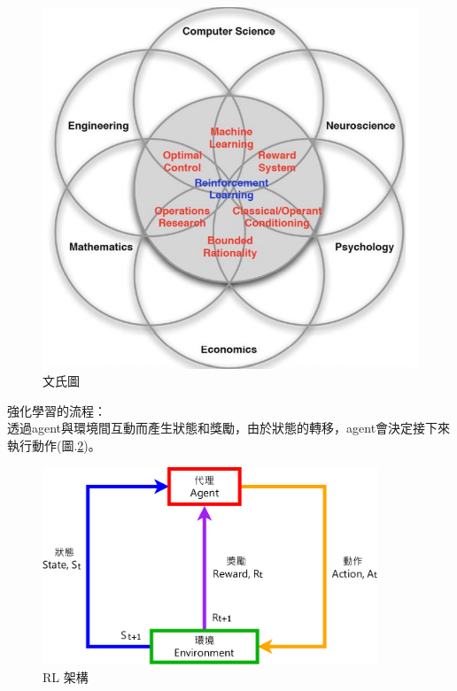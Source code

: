 \documentclass[14pt,a4paper]{report}  %
\begin{document}
\begin{figure}[hbt!]
\begin{center}
\includegraphics[scale=0.6]{Faces_of_Reinforcement_Learning}
\caption{\Large 文氏圖}
\label{文氏圖}
\end{center}
\end{figure}
強化學習的流程：\\
透過agent與環境間互動而產生狀態和獎勵，由於狀態的轉移，agent會決定接下來執行動作(圖.\ref{RL structur})。\\[12pt]

\begin{figure}[hbt!]
\begin{center}
\includegraphics[width=10cm]{The_Flow_of_Reinforcement_Learning}
\caption{\Large RL 架構}
\label{RL structur}
\end{center}
\end{figure}
\end{document}
